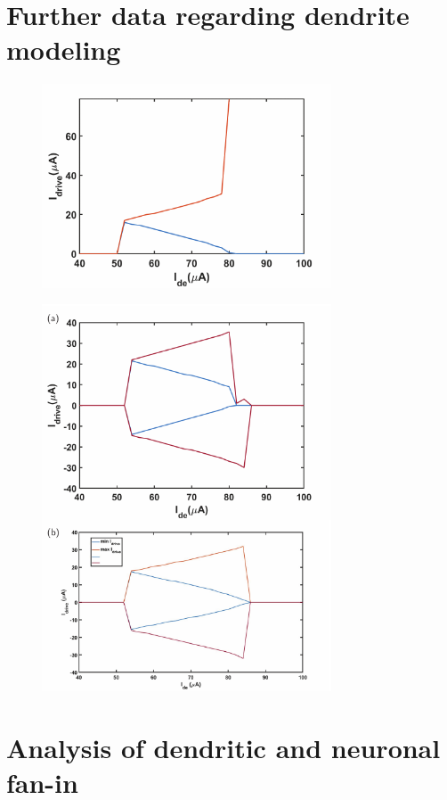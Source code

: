 \documentclass[twocolumn]{article}
\begin{document}
\section{\label{apx:dendrites}Further data regarding dendrite modeling}

\begin{figure}[h!]
\includegraphics[width=8.6cm]{figures/_fig__dendrites__min_max__2jj.pdf}
\end{figure}

\begin{figure}[h!]
\includegraphics[width=8.6cm]{figures/_fig__dendrites__min_max__4jj.pdf}
\end{figure}

\section{\label{apx:fan_in}Analysis of dendritic and neuronal fan-in}
\end{document}
